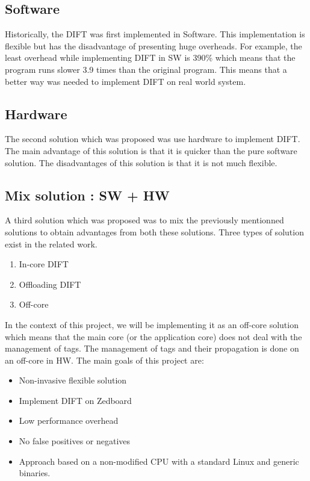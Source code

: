 \documentclass[10pt,a4paper, oneside]{memoir}
\begin{document}
\subsection{Software}
Historically, the DIFT was first implemented in Software. This implementation is flexible but has the disadvantage of presenting huge overheads. For example, the least overhead while implementing DIFT in SW is 390\% which means that the program runs slower 3.9 times than the original program. This means that a better way was needed to implement DIFT on real world system.

\subsection{Hardware}
The second solution which was proposed was use hardware to implement DIFT. The main advantage of this solution is that it is quicker than the pure software solution. The disadvantages of this solution is that it is not much flexible. 

\subsection{Mix solution : SW + HW}
A third solution which was proposed was to mix the previously mentionned solutions to obtain advantages from both these solutions. Three types of solution exist in the related work. 
\begin{enumerate}
\item In-core DIFT
\item Offloading DIFT
\item Off-core 
\end{enumerate}
\vspace{1em}

In the context of this project, we will be implementing it as an off-core solution which means that the main core (or the application core) does not deal with the management of tags. The management of tags and their propagation is done on an off-core in HW. 
The main goals of this project are:
\begin{itemize}
\item Non-invasive flexible solution
\item Implement DIFT on Zedboard 
\item Low performance overhead 
\item No false positives or negatives
\item Approach based on a non-modified CPU with a standard Linux and generic binaries.
\end{itemize}
\vspace{1em}
\end{document}
